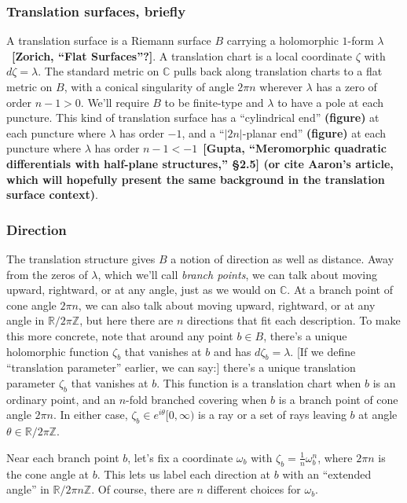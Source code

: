 \documentclass{article}
\newcommand{\Z}{\mathbb{Z}}
\newcommand{\R}{\mathbb{R}}
\newcommand{\C}{\mathbb{C}}
\begin{document}
\subsubsection{Translation surfaces, briefly}

A translation surface is a Riemann surface $B$ carrying a holomorphic $1$-form $\lambda$~\textbf{[Zorich, ``Flat Surfaces''?]}. A translation chart is a local coordinate $\zeta$ with $d\zeta = \lambda$. The standard metric on $\C$ pulls back along translation charts to a flat metric on $B$, with a conical singularity of angle $2\pi n$ wherever $\lambda$ has a zero of order $n-1 > 0$. We'll require $B$ to be finite-type and $\lambda$ to have a pole at each puncture. This kind of translation surface has a ``cylindrical end'' \textbf{(figure)} at each puncture where $\lambda$ has order $-1$, and a ``$|2n|$-planar end'' \textbf{(figure)} at each puncture where $\lambda$ has order $n-1 < -1$~\textbf{[Gupta, ``Meromorphic quadratic differentials with half-plane structures,'' \S 2.5] (or cite Aaron's article, which will hopefully present the same background in the translation surface context)}.
\subsubsection{Direction}\label{transl:dir}
The translation structure gives $B$ a notion of direction as well as distance. Away from the zeros of $\lambda$, which we'll call {\em branch points}, we can talk about moving upward, rightward, or at any angle, just as we would on $\C$. At a branch point of cone angle $2\pi n$, we can also talk about moving upward, rightward, or at any angle in $\R/2\pi\Z$, but here there are $n$ directions that fit each description. To make this more concrete, note that around any point $b \in B$, there's a unique holomorphic function $\zeta_b$ that vanishes at $b$ and has $d\zeta_b = \lambda$. \textcolor{VioletRed}{[If we define ``translation parameter'' earlier, we can say:] there's a unique translation parameter $\zeta_b$ that vanishes at $b$.} This function is a translation chart when $b$ is an ordinary point, and an $n$-fold branched covering when $b$ is a branch point of cone angle $2\pi n$. In either case, $\zeta_b \in e^{i\theta} [0, \infty)$ is a ray or a set of rays leaving $b$ at angle $\theta \in \R/2\pi\Z$.

Near each branch point $b$, let's fix a coordinate $\omega_b$ with $\zeta_b = \tfrac{1}{n} \omega_b^n$, where $2\pi n$ is the cone angle at $b$. This lets us label each direction at $b$ with an ``extended angle'' in $\R/2\pi n\Z$. Of course, there are $n$ different choices for $\omega_b$.
\end{document}
